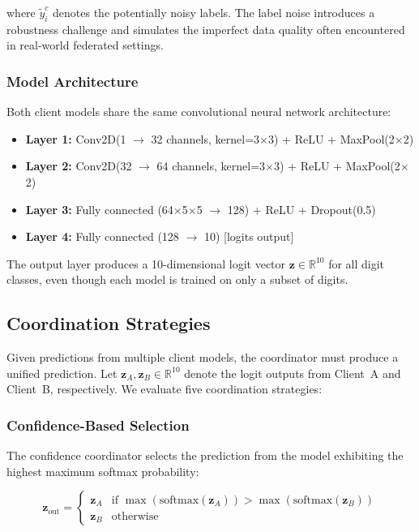 \documentclass[12pt]{article}
\begin{document}
where $\tilde{y}_i^c$ denotes the potentially noisy labels. The label noise introduces a robustness challenge and simulates the imperfect data quality often encountered in real-world federated settings.

\subsubsection{Model Architecture}

Both client models share the same convolutional neural network architecture:

\begin{itemize}
    \item \textbf{Layer 1:} Conv2D(1 $\rightarrow$ 32 channels, kernel=3$\times$3) + ReLU + MaxPool(2$\times$2)
    \item \textbf{Layer 2:} Conv2D(32 $\rightarrow$ 64 channels, kernel=3$\times$3) + ReLU + MaxPool(2$\times$2)
    \item \textbf{Layer 3:} Fully connected (64$\times$5$\times$5 $\rightarrow$ 128) + ReLU + Dropout(0.5)
    \item \textbf{Layer 4:} Fully connected (128 $\rightarrow$ 10) [logits output]
\end{itemize}

The output layer produces a 10-dimensional logit vector $\mathbf{z} \in \mathbb{R}^{10}$ for all digit classes, even though each model is trained on only a subset of digits.

\subsection{Coordination Strategies}
\label{subsec:coordinators}

Given predictions from multiple client models, the coordinator must produce a unified prediction. Let $\mathbf{z}_A, \mathbf{z}_B \in \mathbb{R}^{10}$ denote the logit outputs from Client~A and Client~B, respectively. We evaluate five coordination strategies:

\subsubsection{Confidence-Based Selection}

The confidence coordinator selects the prediction from the model exhibiting the highest maximum softmax probability:

\begin{equation}
\mathbf{z}_{\text{out}} = \begin{cases}
\mathbf{z}_A & \text{if } \max(\text{softmax}(\mathbf{z}_A)) > \max(\text{softmax}(\mathbf{z}_B)) \\
\mathbf{z}_B & \text{otherwise}
\end{cases}
\end{equation}
\end{document}
